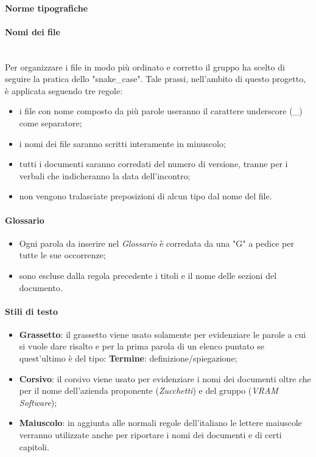        	\paragraph{Norme tipografiche}
            \paragraph*{Nomi dei file}\mbox{}\\ [1mm]
                Per organizzare i file in modo più ordinato e corretto il gruppo ha scelto di seguire la pratica dello "snake\_case"\glo.
                Tale prassi, nell'ambito di questo progetto\glo, è applicata seguendo tre regole:
                \begin{itemize}
                    \item i file con nome composto da più parole useranno il carattere underscore (\_) come separatore;
                    \item i nomi dei file saranno scritti interamente in minuscolo;
                    \item tutti i documenti saranno corredati del numero di versione, tranne per i verbali che indicheranno la data dell'incontro;
                    \item non vengono tralasciate preposizioni di alcun tipo dal nome del file.
                \end{itemize}
            \paragraph*{Glossario}
                \begin{itemize}
                    \item Ogni parola da inserire nel \textit{Glossario} è corredata da una "G" a pedice per tutte le sue occorrenze;
                    \item sono escluse dalla regola precedente i titoli e il nome delle sezioni del documento.
                \end{itemize}
            \paragraph*{Stili di testo}
            \begin{itemize}
                \item \textbf{Grassetto}: il grassetto viene usato solamente per evidenziare le parole a cui si vuole dare risalto e per la prima parola
                                          di un elenco puntato se quest'ultimo è del tipo: \textbf{Termine}: definizione/spiegazione;
                \item \textbf{Corsivo}: il corsivo viene usato per evidenziare i nomi dei documenti oltre che per il nome dell'azienda
                                        proponente (\textit{Zucchetti}) e del gruppo (\textit{VRAM Software});
                \item \textbf{Maiuscolo}: in aggiunta alle normali regole dell'italiano le lettere maiuscole verranno utilizzate anche per riportare i nomi dei
                                          documenti e di certi capitoli.
            \end{itemize}
